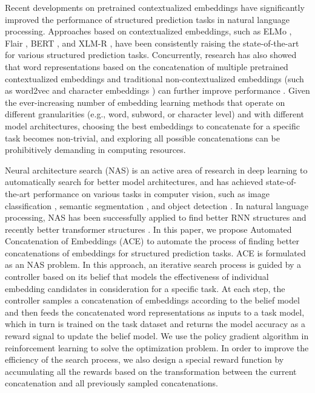 \documentclass[11pt,a4paper]{article}
\begin{document}
Recent developments on pretrained contextualized embeddings have significantly improved the performance of structured prediction tasks in natural language processing. Approaches based on contextualized embeddings, such as ELMo \citep{peters-etal-2018-deep}, Flair \citep{akbik-etal-2018-contextual}, BERT \citep{devlin-etal-2019-bert}, and XLM-R \citep{conneau-etal-2020-unsupervised}, have been consistently raising the state-of-the-art for various structured prediction tasks. Concurrently, research has also showed that word representations based on the concatenation of multiple pretrained contextualized embeddings and traditional non-contextualized embeddings (such as word2vec \citep{mikolov2013distributed} and character embeddings \citep{santos2014learning}) can further improve performance \citep{peters-etal-2018-deep,akbik-etal-2018-contextual,strakova-etal-2019-neural,wang-etal-2020-more}. Given the ever-increasing number of embedding learning methods that operate on different granularities (e.g., word, subword, or character level) and with different model architectures, choosing the best embeddings to concatenate for a specific task becomes non-trivial, and exploring all possible concatenations can be prohibitively demanding in computing resources.



Neural architecture search (NAS) is an active area of research in deep learning to automatically search for better model architectures, and has achieved state-of-the-art performance on various tasks in computer vision, such as image classification \citep{real2019regularized}, semantic segmentation \citep{liu2019auto}, and object detection \citep{ghiasi2019fpn}. In natural language processing, NAS has been successfully applied to find better RNN structures  \citep{zoph2016neural,pham2018efficient} and recently better transformer structures \citep{so2019evolved,zhu2020autotrans}. In this paper, we propose Automated Concatenation of Embeddings (ACE) to automate the process of finding better concatenations of embeddings for structured prediction tasks. ACE is formulated as an NAS problem. In this approach, an iterative search process is guided by a controller based on its belief that models the effectiveness of individual embedding candidates in consideration for a specific task. At each step, the controller samples a concatenation of embeddings according to the belief model and then feeds the concatenated word representations as inputs to a task model, which in turn is trained on the task dataset and returns the model accuracy as a reward signal to update the belief model. We use the policy gradient algorithm \citep{williams1992simple} in reinforcement learning \citep{sutton2018reinforcement} to solve the optimization problem. In order to improve the efficiency of the search process, we also design a special reward function by accumulating all the rewards based on the transformation between the current concatenation and all previously sampled concatenations. 
\end{document}
